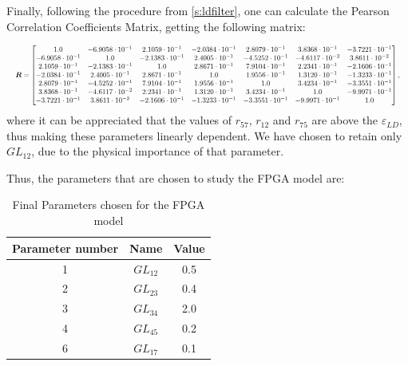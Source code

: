 Finally, following the procedure from \autoref{s:ldfilter}, one can calculate the Pearson Correlation Coefficients Matrix, getting the following matrix:

\begin{equation}
\resizebox{\textwidth}{!}{$\displaystyle
\boldsymbol{R} =  \begin{bmatrix}
    1.0 & -6.9058 \cdot 10^{-1} & 2.1059 \cdot 10^{-1} & -2.0384 \cdot 10^{-1} & 2.8079 \cdot 10^{-1} & 3.8368 \cdot 10^{-1} & -3.7221 \cdot 10^{-1} \\
    -6.9058 \cdot 10^{-1} & 1.0 & -2.1383 \cdot 10^{-1} & 2.4005 \cdot 10^{-1} & -4.5252 \cdot 10^{-1} & -4.6117 \cdot 10^{-2} & 3.8611 \cdot 10^{-2} \\
    2.1059 \cdot 10^{-1} & -2.1383 \cdot 10^{-1} & 1.0 & 2.8671 \cdot 10^{-1} & 7.9104 \cdot 10^{-1} & 2.2341 \cdot 10^{-1} & -2.1606 \cdot 10^{-1} \\
    -2.0384 \cdot 10^{-1} & 2.4005 \cdot 10^{-1} & 2.8671 \cdot 10^{-1} & 1.0 & 1.9556 \cdot 10^{-1} & 1.3120 \cdot 10^{-1} & -1.3233 \cdot 10^{-1} \\
    2.8079 \cdot 10^{-1} & -4.5252 \cdot 10^{-1} & 7.9104 \cdot 10^{-1} & 1.9556 \cdot 10^{-1} & 1.0 & 3.4234 \cdot 10^{-1} & -3.3551 \cdot 10^{-1} \\
    3.8368 \cdot 10^{-1} & -4.6117 \cdot 10^{-2} & 2.2341 \cdot 10^{-1} & 1.3120 \cdot 10^{-1} & 3.4234 \cdot 10^{-1} & 1.0 & -9.9971 \cdot 10^{-1} \\
    -3.7221 \cdot 10^{-1} & 3.8611 \cdot 10^{-2} & -2.1606 \cdot 10^{-1} & -1.3233 \cdot 10^{-1} & -3.3551 \cdot 10^{-1} & -9.9971 \cdot 10^{-1} & 1.0
  \end{bmatrix},
  $}
\end{equation}
where it can be appreciated that the values of $r_{57}$, $r_{12}$ and $r_{75}$ are above the $\varepsilon_{LD}$, thus making these parameters linearly dependent. We have chosen to retain only $GL_{12}$, due to the physical importance of that parameter.


 Thus, the parameters that are chosen to study the FPGA model are:
 \begin{table}[H]
    \centering
    \caption{Final Parameters chosen for the FPGA model}
    \label{tab:finalparamsFPGA}
    
    \begin{tabular}{c c c}
    \toprule
    \multicolumn{1}{c}{\textbf{Parameter number}} & \multicolumn{1}{c}{\textbf{Name}} & \multicolumn{1}{c}{\textbf{Value}} \\ \midrule
    1 & $GL_{12}$ & 0.5 \\
    2 & $GL_{23}$ & 0.4 \\
    3 & $GL_{34}$ & 2.0 \\
    4 & $GL_{45}$ & 0.2 \\
    6 & $GL_{17}$ & 0.1 \\
     \bottomrule  
    \end{tabular}
    \end{table}

